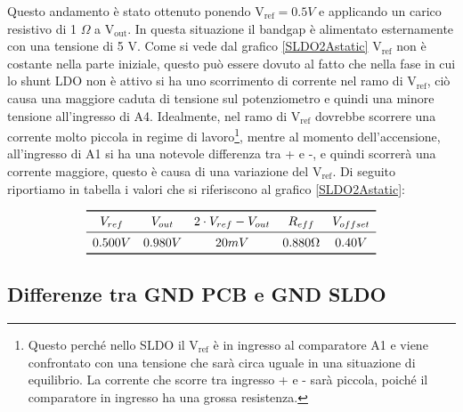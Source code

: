 Questo andamento è stato ottenuto ponendo
$\mathrm{V_{ref} = 0.5} V$ e applicando un carico resistivo di 1 $\Omega$ a $\mathrm{V_{out}}$. In questa situazione il bandgap è alimentato esternamente con una tensione di 5 V. 
Come si vede dal grafico \ref{SLDO2Astatic} $\mathrm{V_{ref}}$ non è costante nella parte iniziale, questo può essere dovuto al fatto che nella fase in cui lo shunt LDO non è attivo si ha uno scorrimento di corrente nel ramo di $\mathrm{V_{ref}}$, ciò causa una maggiore caduta di tensione sul potenziometro e quindi una minore tensione all'ingresso di A4. 
Idealmente, nel ramo di $\mathrm{V_{ref}}$ dovrebbe scorrere una corrente molto piccola in regime di lavoro\footnote{Questo perché nello SLDO il $\mathrm{V_{ref}}$ è in ingresso al comparatore A1 e viene confrontato con una tensione che sarà circa uguale in una situazione di equilibrio. La corrente che scorre tra ingresso + e - sarà piccola, poiché il comparatore in ingresso ha una grossa resistenza.}, mentre al momento dell'accensione, all'ingresso di A1 si ha una notevole differenza tra + e -, e quindi scorrerà una corrente maggiore, questo è causa di una variazione del $\mathrm{V_{ref}}$. Di seguito riportiamo in tabella i valori che si riferiscono al grafico \ref{SLDO2Astatic}: 

\[
\begin{array}{ccccc}

\toprule
V_{ref} & V_{out} & 2 \cdot V_{ref}- V_{out} & R_{eff} & V_{offset} \\

\midrule

0.500 V & 0.980 V & 20 mV & 0.880 \Omega & 0.40 V \\

\bottomrule
\end{array}
\]

\subsection{Differenze tra GND PCB e GND SLDO}


